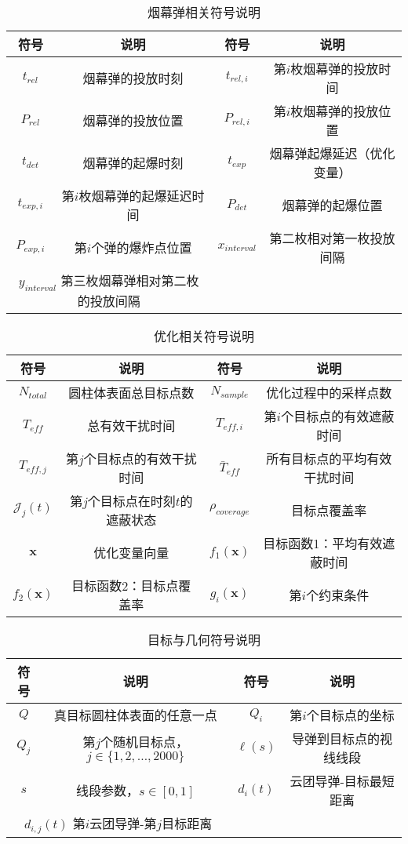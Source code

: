 \begin{table}[htbp]
\centering
\caption{烟幕弹相关符号说明}
\label{tab:symbols_smoke}
\begin{tabular}{cccc}
\toprule
\textbf{符号} & \textbf{说明} & \textbf{符号} & \textbf{说明} \\
\midrule
$t_{rel}$ & 烟幕弹的投放时刻 & $t_{rel,i}$ & 第$i$枚烟幕弹的投放时间 \\
$P_{rel}$ & 烟幕弹的投放位置 & $P_{rel,i}$ & 第$i$枚烟幕弹的投放位置 \\
$t_{det}$ & 烟幕弹的起爆时刻 & $t_{exp}$ & 烟幕弹起爆延迟（优化变量） \\
$t_{exp,i}$ & 第$i$枚烟幕弹的起爆延迟时间 & $P_{det}$ & 烟幕弹的起爆位置 \\
$P_{exp,i}$ & 第$i$个弹的爆炸点位置 & $x_{interval}$ & 第二枚相对第一枚投放间隔 \\
\multicolumn{2}{c}{$y_{interval}$ 第三枚烟幕弹相对第二枚的投放间隔} & & \\
\bottomrule
\end{tabular}
\end{table}

\begin{table}[htbp]
\centering
\caption{优化相关符号说明}
\label{tab:symbols_optimization}
\begin{tabular}{cccc}
\toprule
\textbf{符号} & \textbf{说明} & \textbf{符号} & \textbf{说明} \\
\midrule
$N_{total}$ & 圆柱体表面总目标点数 & $N_{sample}$ & 优化过程中的采样点数 \\
$T_{eff}$ & 总有效干扰时间 & $T_{eff,i}$ & 第$i$个目标点的有效遮蔽时间 \\
$T_{eff,j}$ & 第$j$个目标点的有效干扰时间 & $\bar{T}_{eff}$ & 所有目标点的平均有效干扰时间 \\
$\mathcal{J}_j(t)$ & 第$j$个目标点在时刻$t$的遮蔽状态 & $\rho_{coverage}$ & 目标点覆盖率 \\
$\mathbf{x}$ & 优化变量向量 & $f_1(\mathbf{x})$ & 目标函数1：平均有效遮蔽时间 \\
$f_2(\mathbf{x})$ & 目标函数2：目标点覆盖率 & $g_i(\mathbf{x})$ & 第$i$个约束条件 \\
\bottomrule
\end{tabular}
\end{table}

\begin{table}[t]
\centering
\caption{目标与几何符号说明}
\label{tab:symbols_geometry}
\begin{tabular}{cccc}
\toprule
\textbf{符号} & \textbf{说明} & \textbf{符号} & \textbf{说明} \\
\midrule
$Q$ & 真目标圆柱体表面的任意一点 & $Q_i$ & 第$i$个目标点的坐标\\
$Q_j$ & 第$j$个随机目标点，$j \in \{1,2,\ldots,2000\}$ & $\ell(s)$ & 导弹到目标点的视线线段 \\
$s$ & 线段参数，$s \in [0,1]$ & $d_i(t)$ & 云团导弹-目标最短距离 \\
\multicolumn{2}{c}{$d_{i,j}(t)$ 第$i$云团导弹-第$j$目标距离} & & \\
\bottomrule
\end{tabular}
\end{table}

